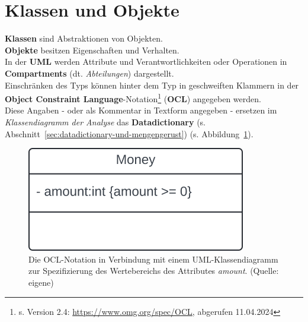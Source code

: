 \section{Klassen und Objekte}

\noindent
\textbf{Klassen} sind Abstraktionen von Objekten.\\

\noindent
\textbf{Objekte} besitzen Eigenschaften und Verhalten.\\

\noindent
In der \textbf{UML} werden Attribute und Verantwortlichkeiten oder Operationen in \textbf{Compartments} (dt. \textit{Abteilungen}) dargestellt.\\

\noindent
Einschränken des Typs können hinter dem Typ in geschweiften Klammern in der \textbf{Object Constraint Language}-Notation\footnote{
s. Version 2.4: \url{https://www.omg.org/spec/OCL}, abgerufen 11.04.2024
} (\textbf{OCL}) angegeben werden.\\
Diese Angaben - oder als Kommentar in Textform angegeben - ersetzen im \textit{Klassendiagramm der Analyse} das \textbf{Datadictionary} (s. Abschnitt~\ref{sec:datadictionary-und-mengengerust}) (s. Abbildung~\ref{fig:moneyocl}).

\begin{figure}
    \centering
    \includegraphics[scale=0.4]{part two/Objektorientierte Analyse/img/moneyocl}
    \caption{Die OCL-Notation in Verbindung mit einem UML-Klassendiagramm zur Spezifizierung des Wertebereichs des Attributes \textit{amount}. (Quelle: eigene)}
    \label{fig:moneyocl}
\end{figure}